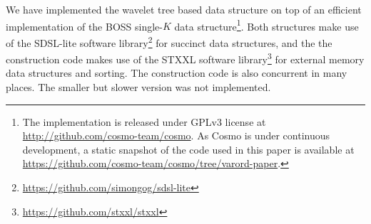 \begin{sidewaystable}
\begin{tabularx}{\linewidth}{rd{3.2}d{4.9}d{3.2}d{4.9}d{3.2}d{5.9}d{3.2}d{5.9}}

\bottomrule
\end{tabularx}
\label{tab:nav-time}
\end{sidewaystable}

We have implemented the wavelet tree based data structure on top of an efficient implementation of the BOSS single-$K$ data structure\footnote{The
implementation is released under GPLv3 license at \url{http://github.com/cosmo-team/cosmo}. As Cosmo is under continuous development,
a static snapshot of the code used in this paper is available at \url{https://github.com/cosmo-team/cosmo/tree/varord-paper}.}.
Both structures make use of the SDSL-lite software library\footnote{\url{https://github.com/simongog/sdsl-lite}} for succinct data structures, and the
the construction code makes use of the STXXL software library\footnote{\url{https://github.com/stxxl/stxxl}} for external memory data structures and sorting.
The construction code is also concurrent in many places.%
The smaller but slower version was not implemented.

